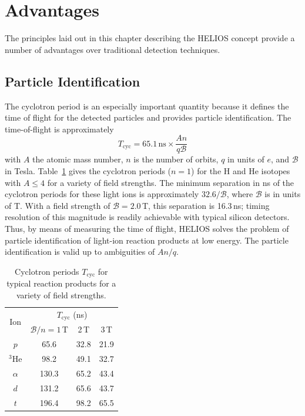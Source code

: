 \section{Advantages}
The principles laid out in this chapter describing the HELIOS concept provide a number of advantages over traditional detection techniques.
\subsection{Particle Identification}
\par The cyclotron period is an especially important quantity because it defines the time of flight for the detected particles and provides particle identification.  The time-of-flight is approximately%
\begin{equation}
T_\mathrm{cyc}=65.1\,\textrm{ns}\times \frac{An}{q\mathscr{B}}
\end{equation}
with $A$ the atomic mass number, $n$ is the number of orbits, $q$ in units of $e$, and $\mathscr{B}$ in Tesla.  Table~\ref{flight_times} gives the cyclotron periods ($n=1$) for the H and He isotopes with $A\leq 4$ for %
a variety of field strengths.  The minimum separation in ns of the cyclotron periods for these light ions is approximately  $32.6/\mathscr{B}$, where $\mathscr{B}$ is in units of T.  With a field strength of $\mathscr{B}=2.0$\,T, this separation is 16.3\,ns; timing resolution of this magnitude is readily achievable with typical silicon detectors.  Thus, by means of measuring the time of flight, HELIOS solves the problem of particle identification of light-ion reaction products at low energy.  The particle identification is valid up to ambiguities of $An/q$.
\begin{table}
  \begin{center}
    \begin{tabular}{cccc}
      \hline
      \multicolumn{1}{c}{\multirow{2}{*}{Ion}}  &
    	\multicolumn{3}{c}{$T_\mathrm{cyc}$ (ns)}\\ \cline{2-4}
    	&$\mathscr{B}/n=1$\,T&2\,T&3\,T\\\hline \hline 
      $p$&65.6&32.8&21.9\\
      $^3$He&98.2&49.1&32.7\\
      $\alpha$&130.3&65.2&43.4\\
      $d$&131.2&65.6&43.7\\
      $t$&196.4&98.2&65.5\\\hline
    \end{tabular}
    \label{flight_times}
    \caption[Cyclotron periods $T_\mathrm{cyc}$ for typical reaction products for a variety of field strengths]{Cyclotron periods $T_\mathrm{cyc}$ for typical reaction products for a variety of field strengths.}
  \end{center}
\end{table}
